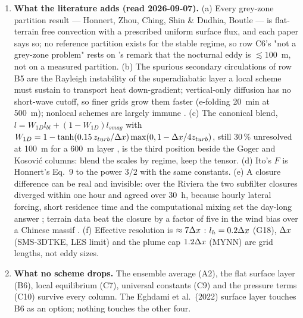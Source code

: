 \begin{small}
\begin{enumerate}[leftmargin=*,itemsep=2pt]
\item \textbf{What the literature adds (read 2026-09-07).} (a) Every grey-zone partition result --- Honnert, Zhou, Ching, Shin \& Dudhia, Boutle --- is flat-terrain free convection with a prescribed uniform surface flux, and each paper says so; no reference partition exists for the stable regime, so row C6's "not a grey-zone problem" rests on \textcite{zhou2014}'s remark that the nocturnal eddy is $\lesssim 100$~m, not on a measured partition. (b) The spurious secondary circulations of row B5 are the Rayleigh instability of the superadiabatic layer a local scheme must sustain to transport heat down-gradient; vertical-only diffusion has no short-wave cutoff, so finer grids grow them faster (e-folding 20~min at 500~m); nonlocal schemes are largely immune \parencite{ching2014}. (c) The canonical blend, $l = W_{1D}l_{bl} + (1 - W_{1D})l_{smag}$ with $W_{1D} = 1 - \tanh(0.15\,z_{turb}/\Delta x)\max(0, 1 - \Delta x/4z_{turb})$, still 30\,\% unresolved at 100~m for a 600~m layer \parencite{boutle2014}, is the third position beside the Goger and Kosović columns: blend the scales by regime, keep the tensor. (d) Ito's $F$ is Honnert's Eq.~9 to the power $3/2$ with the same constants. (e) A closure difference can be real and invisible: over the Riviera the two subfilter closures diverged within one hour and agreed over 30~h, because hourly lateral forcing, short residence time and the computational mixing set the day-long answer \parencite{chow2006}; terrain data beat the closure by a factor of five in the wind bias over a Chinese massif \parencite{liu2020}. (f) Effective resolution is $\approx 7\Delta x$ \parencite{skamarock2004}: $l_h = 0.2\Delta x$ (G18), $\Delta x$ (SMS-3DTKE, LES limit) and the plume cap $1.2\Delta x$ (MYNN) are grid lengths, not eddy sizes.
\item \textbf{What no scheme drops.} The ensemble average (A2), the flat surface layer (B6), local
equilibrium (C7), universal constants (C9) and the pressure terms (C10) survive every column. The
Eghdami et al.\ (2022) surface layer touches B6 as an option; nothing touches the other four.
\end{enumerate}
\end{small}
